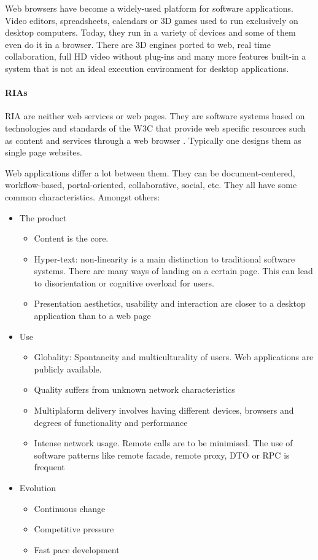Web browsers have become a widely-used platform for software applications. 
Video editors, spreadsheets, calendars or 3D games used to run exclusively on desktop computers. 
Today, they run in a variety of devices and some of them even do it in a browser. 
There are 3D engines ported to web, real time collaboration, full HD video without plug-ins and many more features built-in a system that is not an ideal execution environment for desktop applications.

\paragraph{\acp{RIA}}
\acs{RIA} are neither web services or web pages. 
They are software systems based on technologies and standards of the \ac{W3C} that provide web specific resources such as content and services through a web browser \cite{Kappel:2006}.
Typically one designs them as single page websites.

Web applications differ a lot between them. 
They can be document-centered, workflow-based, portal-oriented, collaborative, social, etc. 
They all have some common characteristics. Amongst others:
\begin{itemize}
    \item The product
    \begin{itemize}
        \item Content is the core.
        \item Hyper-text: non-linearity is a main distinction to traditional software systems. There are many ways of landing on a certain page. This can lead to disorientation or cognitive overload for users.
        \item Presentation aesthetics, usability and interaction are closer to a desktop application than to a web page
    \end{itemize}
    \item Use
    \begin{itemize}
        \item Globality: Spontaneity and multiculturality of users. Web applications are publicly available.
        \item Quality suffers from unknown network characteristics
        \item Multiplaform delivery involves having different devices, browsers and degrees of functionality and performance
        \item Intense network usage. Remote calls are to be minimised. The use of software patterns like remote facade, remote proxy, DTO or RPC is frequent
    \end{itemize}
    \item Evolution
    \begin{itemize}
         \item Continuous change
         \item Competitive pressure
         \item Fast pace development
    \end{itemize}   
\end{itemize}

